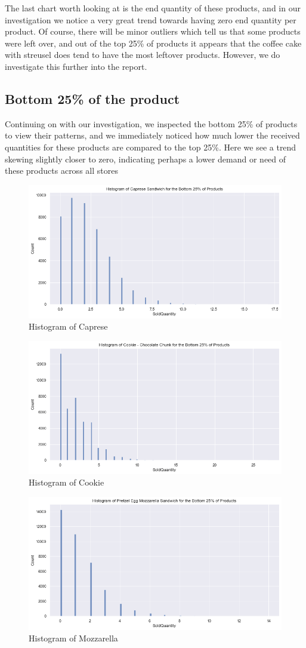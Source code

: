 The last chart worth looking at is the end quantity of these products, and in our investigation we notice a very great trend towards having zero end quantity per product. Of course, there will be minor outliers which tell us that some products were left over, and out of the top 25\% of products it appears that the coffee cake with streusel does tend to have the most leftover products. However, we do investigate this further into the report.


\subsection{Bottom 25\% of the product }

Continuing on with our investigation, we inspected the bottom 25\% of products to view their patterns, and we immediately noticed how much lower the received quantities for these products are compared to the top 25\%. Here we see a trend skewing slightly closer to zero, indicating perhaps a lower demand or need of these products across all stores

\begin{figure}[ht]
    \centering
    \includegraphics[width = 0.56\linewidth]{figures/figure20.png}
    \caption{Histogram of Caprese }
\end{figure}

\begin{figure}[ht]
    \centering
    \includegraphics[width = 0.56\linewidth]{figures/figure21.png}
    \caption{Histogram of Cookie }
\end{figure}

\begin{figure}[ht]
    \centering
    \includegraphics[width = 0.56\linewidth]{figures/figure22.png}
    \caption{Histogram of Mozzarella }
\end{figure}

